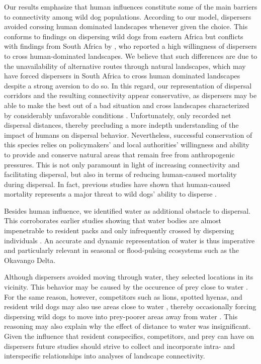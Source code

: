 \documentclass[abstract=on,10pt,a4paper,bibliography=totocnumbered]{article}
\begin{document}
Our results emphasize that human influences constitute some of the main barriers
to connectivity among wild dog populations. According to our model, dispersers
avoided corssing human dominated landscapes whenever given the
choice. This conforms to findings on dispersing wild dogs
from eastern Africa \citep{Masenga.2016, Oneill.2020} but conflicts with
findings from South Africa by \cite{DaviesMostert.2012}, who reported a high
willingness of dispersers to cross human-dominated landscapes. We believe that
such differences are due to the unavailability of alternative routes through
natural landscapes, which may have forced dispersers in South Africa to cross
human dominated landscapes despite a strong aversion to do so. In this regard,
our representation of dispersal corridors and the resulting connectivity appear
conservative, as dispersers may be able to make the best out of a bad situation
and cross landscapes characterized by considerably unfavorable conditions
\citep{Palomares.2000, Elliot.2014}. Unfortunately, \cite{DaviesMostert.2012}
only recorded net dispersal distances, thereby precluding a more indepth
understanding of the impact of humans on dispersal behavior. Nevertheless, successful conservation of this species relies on
policymakers' and local authorities' willingness and ability to provide and
conserve natural areas that remain free from anthropogenic pressures. This is
not only paramount in light of increasing connectivity and facilitating
dispersal, but also in terms of reducing human-caused mortality during
dispersal. In fact, previous studies have shown that human-caused mortality
represents a major threat to wild dogs' ability to disperse
\citep{Woodroffe.2019, Cozzi.2020}.

Besides human influence, we identified water as additional obstacle to
dispersal. This corroborates earlier studies showing that water bodies are
almost impenetrable to resident packs \citep{Abrahms.2017} and only infrequently
crossed by dispersing individuals \citep{Cozzi.2020}. An accurate and dynamic
representation of water is thus imperative and particularly relevant in seasonal
or flood-pulsing ecosystems such as the Okavango Delta.

Although dispersers avoided moving through water, they selected locations in its
vicinity. This behavior may be caused by the occurence of prey close to water
\citep{Bonyongo.2005}. For the same reason, however, competitors such as lions,
spotted hyenas, and resident wild dogs may also use areas close to water
\citep{Valeix.2010}, thereby occasionally forcing dispersing wild dogs to move
into prey-poorer areas away from water \citep{Creel.2002, Mills.1997}. This
reasoning may also explain why the effect of distance to water was
insignificant. Given the influence that
resident conspecifics, competitors, and prey can have on dispersers
\citep{Cozzi.2018, Armansin.2019} future studies should strive to collect and
incorporate intra- and interspecific relationships into analyses of landscape
connectivity.
\end{document}
